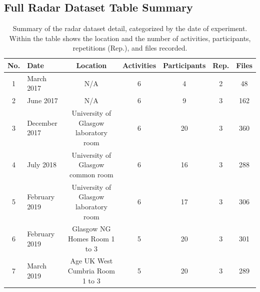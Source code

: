 \documentclass{l4proj}
\begin{document}
\begin{appendices}
\section{Full Radar Dataset Table Summary}
\begin{table}[h]
    \centering
    \begin{tabular}{|c|p{2.5cm}|c|c|c|c|c|}
        \hline
        \rowcolor{lightgray}
        \textbf{No.} & \textbf{Date} & \textbf{Location} & \textbf{Activities} & \textbf{Participants} & \textbf{Rep.} & \textbf{Files} \\
        \hline
        1 & March 2017 & N/A & 6 & 4 & 2 & 48 \\
        \hline
        2 & June 2017 & N/A & 6 & 9 & 3 & 162 \\
        \hline
        3 & December 2017 & University of Glasgow laboratory room & 6 & 20 & 3 & 360 \\
        \hline
        4 & July 2018 & University of Glasgow common room & 6 & 16 & 3 & 288 \\
        \hline
        5 & February 2019 & University of Glasgow laboratory room & 6 & 17 & 3 & 306 \\
        \hline
        6 & February 2019 & Glasgow NG Homes Room 1 to 3 & 5 & 20 & 3 & 301 \\
        \hline
        7 & March 2019 & Age UK West Cumbria Room 1 to 3 & 5 & 20 & 3 & 289 \\
        \hline
    \end{tabular}
    \caption{Summary of the radar dataset detail, categorized by the date of experiment. Within the table shows the location and the number of activities, participants, repetitions (Rep.), and files recorded.}
    \label{tab:dataset-details}
\end{table}


\end{appendices}
\end{document}
